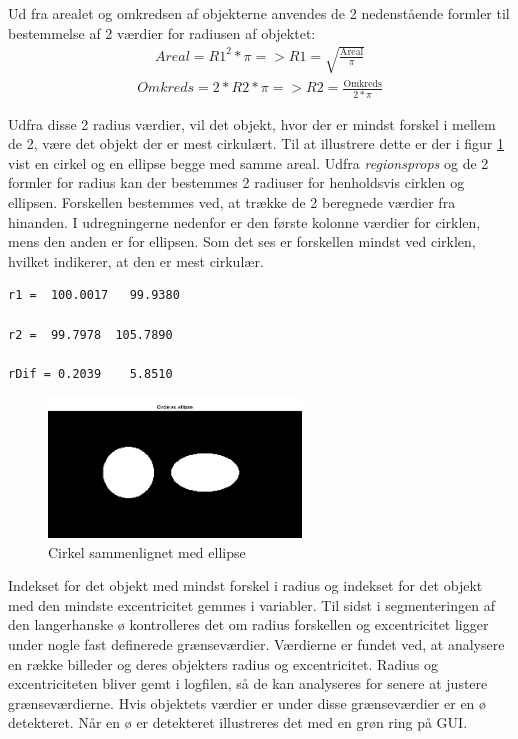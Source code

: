 Ud fra arealet og omkredsen af objekterne anvendes de 2 nedenstående formler til bestemmelse af 2 værdier for radiusen af objektet:
\begin{align}
Areal = R1^2*\pi => R1 = \sqrt{\frac{\text{Areal}}{\pi}}
\end{align}
\begin{align}
Omkreds = 2*R2*\pi => R2 = \frac{\text{Omkreds}}{2*\pi}
\end{align}

Udfra disse 2 radius værdier, vil det objekt, hvor der er mindst forskel i mellem de 2, være det objekt der er mest cirkulært. Til at illustrere dette er der i figur \ref{fig:circleelip} vist en cirkel og en ellipse begge med samme areal. Udfra \textit{regionsprops} og de 2 formler for radius kan der bestemmes 2 radiuser for henholdsvis cirklen og ellipsen. Forskellen bestemmes ved, at trække de 2 beregnede værdier fra hinanden. I udregningerne nedenfor er den første kolonne værdier for cirklen, mens den anden er for ellipsen. Som det ses er forskellen mindst ved cirklen, hvilket indikerer, at den er mest cirkulær.
  
\begin{lstlisting} 
r1 =  100.0017   99.9380

r2 =  99.7978  105.7890

rDif = 0.2039    5.8510
\end{lstlisting} 

\begin{figure}[H]
	\centering
	\includegraphics[width=0.6\textwidth]{billeder/software/circleellipse.png}
	\caption{Cirkel sammenlignet med ellipse}
	\label{fig:circleelip}
\end{figure}

Indekset for det objekt med mindst forskel i radius og indekset for det objekt med den mindste excentricitet gemmes i variabler. 
Til sidst i segmenteringen af den langerhanske ø kontrolleres det om radius forskellen og excentricitet ligger under nogle fast definerede grænseværdier. Værdierne er fundet ved, at analysere en række billeder og deres objekters radius og excentricitet. Radius og excentriciteten bliver gemt i logfilen, så de kan analyseres for senere at justere grænseværdierne. Hvis objektets værdier er under disse grænseværdier er en ø detekteret. Når en ø er detekteret illustreres det med en grøn ring på GUI.

